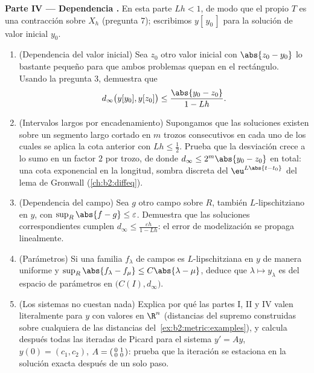 \begin{problem}
\medskip
\noindent\textbf{Parte IV --- Dependencia .} En esta parte
$Lh < 1$, de modo que el propio $T$ es una contracción sobre $X_h$
(pregunta 7); escribimos $y[\,y_0\,]$ para la solución de valor
inicial $y_0$.
\begin{enumerate}[resume]
  \item (Dependencia del valor inicial) Sea $z_0$ otro valor
        inicial con $\abs{z_0 - y_0}$ lo bastante pequeño para que
        ambos problemas quepan en el rectángulo. Usando la pregunta
        3, demuestra que
        \[
        d_\infty\bigl(y[y_0], y[z_0]\bigr) \leq
        \frac{\abs{y_0 - z_0}}{1 - Lh}.
        \]
  \item (Intervalos largos por encadenamiento) Supongamos que las
        soluciones existen sobre un segmento largo cortado en $m$
        trozos consecutivos en cada uno de los cuales se aplica la
        cota anterior con $Lh \leq \frac12$. Prueba que la
        desviación crece a lo sumo en un factor $2$ por trozo, de
        donde $d_\infty \leq 2^m\abs{y_0 - z_0}$ en total: una cota
        exponencial en la longitud, sombra discreta del
        $\eu^{L\abs{t - t_0}}$ del lema de Gronwall
        (\cref{ch:b2:diffeq}).
  \item (Dependencia del campo) Sea $g$ otro campo sobre $R$,
        también $L$-lipschitziano en $y$, con $\sup_R \abs{f - g}
        \leq \varepsilon$. Demuestra que las soluciones
        correspondientes cumplen $d_\infty \leq \frac{\varepsilon
        h}{1 - Lh}$: el error de modelización se propaga
        linealmente.
  \item (Parámetros) Si una familia $f_\lambda$ de campos es
        $L$-lipschitziana en $y$ de manera uniforme y
        $\sup_R\abs{f_\lambda - f_\mu} \leq C\abs{\lambda - \mu}$,
        deduce que $\lambda \mapsto y_\lambda$ es 
        del espacio de parámetros en $\bigl(C(I), d_\infty\bigr)$.
  \item (Los sistemas no cuestan nada) Explica por qué las partes
        I, II y IV valen literalmente para $y$ con valores en
        $\R^n$ (distancias del supremo construidas sobre
        cualquiera de las distancias del~\cref{ex:b2:metric:examples}), y calcula después todas las
        iteradas de Picard para el sistema $y' = Ay$, $y(0) = (c_1,
        c_2)$, $A = \begin{psmallmatrix} 0 & 1\\ 0 &
        0\end{psmallmatrix}$: prueba que la iteración se estaciona
        en la solución exacta después de un solo paso.
\end{enumerate}


\end{problem}

